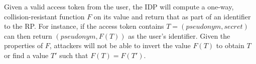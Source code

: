 \documentclass{llncs}
\begin{document}

Given a valid access token from the user, the IDP will compute a
one-way, collision-resistant function $F$ on its value and return that
as part of an identifier to the RP. For instance, if the access token
contains $T = (pseudonym, secret)$ can then return $(pseudonym, F(T))$
as the user's identifier. Given the properties of $F$, attackers will
not be able to invert the value $F(T)$ to obtain $T$ or find a value
$T'$ such that $F(T) = F(T')$.
\end{document}
